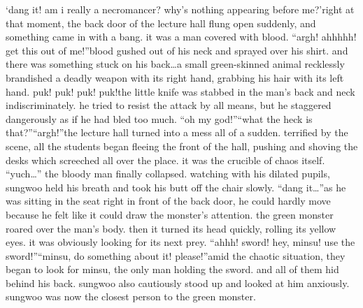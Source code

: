 ‘dang it! am i really a necromancer? why’s nothing appearing before me?’right at that moment, the back door of the lecture hall flung open suddenly, and something came in with a bang.
it was a man covered with blood.
“argh! ahhhhh! get this out of me!”blood gushed out of his neck and sprayed over his shirt.
 and there was something stuck on his back…a small green-skinned animal recklessly brandished a deadly weapon with its right hand, grabbing his hair with its left hand.
puk! puk! puk! puk!the little knife was stabbed in the man’s back and neck indiscriminately.
 he tried to resist the attack by all means, but he staggered dangerously as if he had bled too much.
“oh my god!”“what the heck is that?”“argh!”the lecture hall turned into a mess all of a sudden.
 terrified by the scene, all the students began fleeing the front of the hall, pushing and shoving the desks which screeched all over the place.
it was the crucible of chaos itself.
“yuch…” the bloody man finally collapsed.
watching with his dilated pupils, sungwoo held his breath and took his butt off the chair slowly.
“dang it…”as he was sitting in the seat right in front of the back door, he could hardly move because he felt like it could draw the monster’s attention.
the green monster roared over the man’s body.
 then it turned its head quickly, rolling its yellow eyes.
 it was obviously looking for its next prey.
“ahhh! sword! hey, minsu! use the sword!”“minsu, do something about it! please!”amid the chaotic situation, they began to look for minsu, the only man holding the sword.
 and all of them hid behind his back.
 sungwoo also cautiously stood up and looked at him anxiously.
 sungwoo was now the closest person to the green monster.

